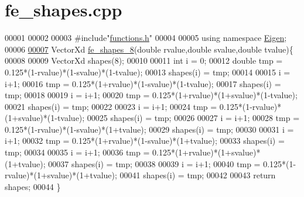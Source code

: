 \hypertarget{fe__shapes_8cpp_source}{}\section{fe\+\_\+shapes.\+cpp}
\label{fe__shapes_8cpp_source}

\begin{DoxyCode}
00001 
00002 
00003 \textcolor{preprocessor}{#include"\hyperlink{functions_8h}{functions.h}"}
00004 
00005 \textcolor{keyword}{using namespace }\hyperlink{namespace_eigen}{Eigen};
00006 
\hyperlink{fe__shapes_8cpp_ab77a3a6d6f6b436d7e8c600bb0869927}{00007} VectorXd \hyperlink{fe__shapes_8cpp_ab77a3a6d6f6b436d7e8c600bb0869927}{fe\_shapes\_8}(\textcolor{keywordtype}{double} rvalue,\textcolor{keywordtype}{double} svalue,\textcolor{keywordtype}{double} tvalue)\{
00008 
00009     VectorXd shapes(8);
00010 
00011     \textcolor{keywordtype}{int} i = 0;
00012     \textcolor{keywordtype}{double} tmp = 0.125*(1-rvalue)*(1-svalue)*(1-tvalue);
00013     shapes(i) = tmp;
00014 
00015     i = i+1;
00016     tmp = 0.125*(1+rvalue)*(1-svalue)*(1-tvalue);
00017         shapes(i) = tmp;
00018 
00019     i = i+1;
00020         tmp = 0.125*(1+rvalue)*(1+svalue)*(1-tvalue);
00021         shapes(i) = tmp;
00022 
00023     i = i+1;
00024         tmp = 0.125*(1-rvalue)*(1+svalue)*(1-tvalue);
00025         shapes(i) = tmp;
00026 
00027     i = i+1;
00028         tmp = 0.125*(1-rvalue)*(1-svalue)*(1+tvalue);
00029         shapes(i) = tmp;
00030 
00031     i = i+1;
00032         tmp = 0.125*(1+rvalue)*(1-svalue)*(1+tvalue);
00033         shapes(i) = tmp;
00034 
00035     i = i+1;
00036         tmp = 0.125*(1+rvalue)*(1+svalue)*(1+tvalue);
00037         shapes(i) = tmp;
00038 
00039     i = i+1;
00040         tmp = 0.125*(1-rvalue)*(1+svalue)*(1+tvalue);
00041         shapes(i) = tmp;
00042 
00043     \textcolor{keywordflow}{return} shapes;
00044 \}
\end{DoxyCode}
